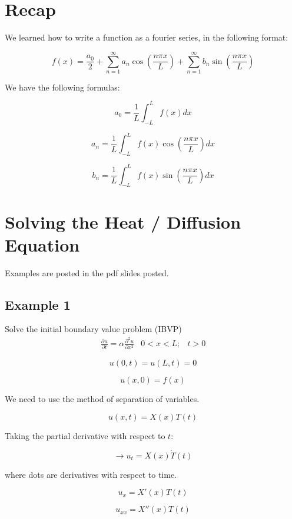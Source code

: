 \graphicspath{{./Lecture9/}}

\section{Recap}

We learned how to write a function as a fourier series, in the following format:

$$f(x) = \frac{a_0}{2} + \sum_{n = 1}^\infty a_n \cos( \frac{n \pi x}{L}) + \sum_{n = 1}^\infty b_n \sin(\frac{n \pi x}{L})$$

We have the following formulas:

$$a_0 = \frac{1}{L} \int_{-L}^L f(x) dx$$

$$a_n = \frac{1}{L} \int_{-L}^L f(x) \cos(\frac{n \pi x}{L}) dx$$

$$b_n = \frac{1}{L} \int_{-L}^L f(x) \sin(\frac{n \pi x}{L}) dx$$

\section{Solving the Heat / Diffusion Equation}

Examples are posted in the pdf slides posted. 

\subsection{Example 1}

Solve the initial boundary value problem (IBVP)
\begin{equation}
\label{Heat Equation}
    \begin{matrix} \frac{\partial u}{\partial t} = \alpha \frac{\partial^2 u}{\partial x^2} & 0 < x < L; & t > 0 \end{matrix}
\end{equation}


$$u(0,t) = u(L,t) = 0$$

$$u(x,0) = f(x)$$

We need to use the method of separation of variables. 

$$u(x,t) = X(x) T(t)$$

Taking the partial derivative with respect to $t$:

$$\rightarrow u_t = X(x) \dot{T} (t)$$

where dots are derivatives with respect to time. 

$$u_x = X'(x) T(t)$$

$$u_{xx} = X''(x) T(t)$$

